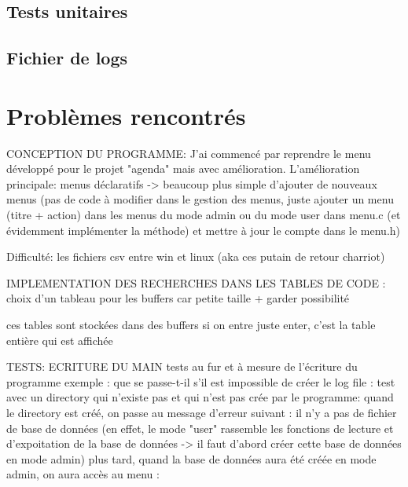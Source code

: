 \documentclass{article}
\begin{document}
    \subsection{Tests unitaires}

    \subsection{Fichier de logs}

    \subsection{}

    \section{Problèmes rencontrés}

    CONCEPTION DU PROGRAMME:
    J'ai commencé par reprendre le menu développé pour le projet "agenda" mais avec amélioration. L'amélioration principale: menus déclaratifs -> beaucoup plus simple d'ajouter de nouveaux menus (pas de code à modifier dans le gestion des menus, juste ajouter un menu (titre + action) dans les menus du mode admin ou du mode user dans menu.c (et évidemment implémenter la méthode) et mettre à jour le compte dans le menu.h)

    Difficulté: les fichiers csv entre win et linux (aka ces putain de retour charriot)

    IMPLEMENTATION DES RECHERCHES DANS LES TABLES DE CODE :
    choix d'un tableau pour les buffers car petite taille + garder possibilité

    ces tables sont stockées dans des buffers
    si on entre juste enter, c'est la table entière qui est affichée




    TESTS:
ECRITURE DU MAIN
    tests au fur et à mesure de l'écriture du programme
    exemple : que se passe-t-il s'il est impossible de créer le log file :
    test avec un directory qui n'existe pas et qui n'est pas crée par le programme:
    quand le directory est créé, on passe au message d'erreur suivant : il n'y a pas de fichier de base de données (en effet, le mode "user" rassemble les fonctions de lecture et d'expoitation de la base de données -> il faut d'abord créer cette base de données en mode admin)
    plus tard, quand la base de données aura été créée en mode admin, on aura accès au menu :
\end{document}

